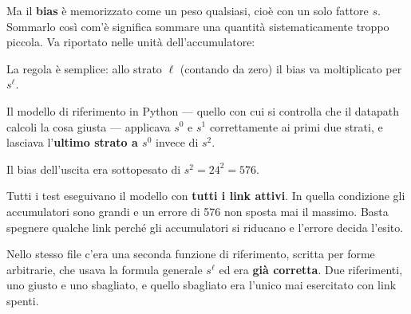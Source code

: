 \documentclass[11pt,a4paper,oneside]{report}
\begin{document}
Ma il \textbf{bias} è memorizzato come un peso qualsiasi, cioè con un solo
fattore $s$. Sommarlo così com'è significa sommare una quantità
sistematicamente troppo piccola. Va riportato nelle unità dell'accumulatore:

\begin{center}
\end{center}

La regola è semplice: allo strato $\ell$ (contando da zero) il bias va
moltiplicato per $s^{\ell}$.

\begin{prima}[L'errore]
Il modello di riferimento in Python --- quello con cui si controlla che il
datapath calcoli la cosa giusta --- applicava $s^0$ e $s^1$ correttamente ai
primi due strati, e lasciava l'\textbf{ultimo strato a $s^0$} invece di $s^2$.

Il bias dell'uscita era sottopesato di $s^2 = 24^2 = 576$.
\end{prima}

\begin{prima}
Tutti i test eseguivano il modello con \textbf{tutti i link attivi}. In quella
condizione gli accumulatori sono grandi e un errore di 576 non sposta mai il
massimo. Basta spegnere qualche link perché gli accumulatori si riducano e
l'errore decida l'esito.

Nello stesso file c'era una seconda funzione di riferimento, scritta per forme
arbitrarie, che usava la formula generale $s^{\ell}$ ed era \textbf{già
corretta}. Due riferimenti, uno giusto e uno sbagliato, e quello sbagliato era
l'unico mai esercitato con link spenti.
\end{prima}
\end{document}
